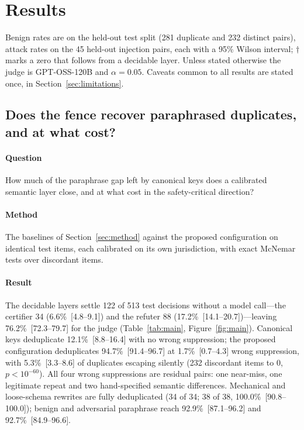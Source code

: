 \section{Results}\label{sec:results}

Benign rates are on the held-out test split (281 duplicate and 232 distinct pairs), attack rates on the 45 held-out injection pairs, each with a 95\% Wilson interval; $\dagger$ marks a zero that follows from a decidable layer. Unless stated otherwise the judge is GPT-OSS-120B and $\alpha=0.05$. Caveats common to all results are stated once, in Section~\ref{sec:limitations}.

\subsection{Does the fence recover paraphrased duplicates, and at what cost?}\label{sec:res-main}

\paragraph{Question} How much of the paraphrase gap left by canonical keys does a calibrated semantic layer close, and at what cost in the safety-critical direction?

\paragraph{Method} The baselines of Section~\ref{sec:method} against the proposed configuration on identical test items, each calibrated on its own jurisdiction, with exact McNemar tests over discordant items.

\paragraph{Result} The decidable layers settle 122 of 513 test decisions without a model call---the certifier 34 (6.6\%~[4.8--9.1]) and the refuter 88 (17.2\%~[14.1--20.7])---leaving 76.2\%~[72.3--79.7] for the judge (Table~\ref{tab:main}, Figure~\ref{fig:main}). Canonical keys deduplicate 12.1\%~[8.8--16.4] with no wrong suppression; the proposed configuration deduplicates 94.7\%~[91.4--96.7] at 1.7\%~[0.7--4.3] wrong suppression, with 5.3\%~[3.3--8.6] of duplicates escaping silently (232 discordant items to 0, $p<10^{-60}$). All four wrong suppressions are residual pairs: one near-miss, one legitimate repeat and two hand-specified semantic differences. Mechanical and loose-schema rewrites are fully deduplicated (34 of 34; 38 of 38, 100.0\%~[90.8--100.0]); benign and adversarial paraphrase reach 92.9\%~[87.1--96.2] and 92.7\%~[84.9--96.6].

